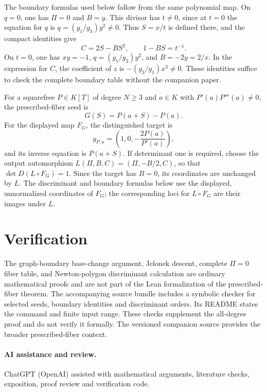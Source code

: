 \documentclass[11pt]{article}
\numberwithin{equation}{section}
\begin{document}
The boundary formulas used below follow from the same polynomial map.
On \(q=0\), one has \(\Pi=0\) and \(B=y\).  This divisor has
\(t\neq0\), since at \(t=0\) the equation for \(q\) is
\(q=(g_1/g_3)y^2\neq0\).  Thus \(S=x/t\) is defined there, and the compact
identities give
\[
 C=2S-BS^2,\qquad 1-BS=t^{-1}.
\]
On \(t=0\), one has \(xy=-1\),
\(q=(g_1/g_3)y^2\), and \(B=-2y=2/x\).  In the expression for \(C\),
the coefficient of \(z\) is \(-(g_3/g_1)x^3\neq0\).  These identities
suffice to check the complete boundary table without the companion paper.

For a squarefree \(P\in K[T]\) of degree \(N\geq3\) and
\(a\in K\) with \(P'(a)P'''(a)\neq0\), the prescribed-fiber seed is
\[
 G(S)=P(a+S)-P(a).
\]
For the displayed map \(F_G\), the distinguished target is
\begin{equation}
 y_{P,a}=\left(1,0,-\frac{2P(a)}{P'(a)}\right),
 \label{eq:prescribed-target}
\end{equation}
and its inverse equation is \(P(a+S)\).  If determinant one is required,
choose the output automorphism \(L(\Pi,B,C)=(\Pi,-B/2,C)\),
so that \(\det D(L\circ F_G)=1\).  Since the target has \(B=0\),
its coordinates are unchanged by \(L\).  The discriminant and boundary
formulas below use the displayed, unnormalized coordinates of \(F_G\);
the corresponding loci for \(L\circ F_G\) are their images under \(L\).



\section*{Verification}

The graph-boundary base-change argument, Jelonek descent, complete
\(\Pi=0\) fiber table, and Newton-polygon discriminant calculation are
ordinary mathematical proofs and are not part of the Lean formalization of
the prescribed-fiber theorem.  The accompanying source bundle includes a symbolic checker for selected
seeds, boundary identities and discriminant orders.  Its README states the
command and finite input range.  These checks supplement the all-degree
proof and do not verify it formally.  The versioned companion source
\cite{Companion} provides the broader prescribed-fiber context.

\paragraph{AI assistance and review.}
ChatGPT (OpenAI) assisted with mathematical arguments, literature checks,
exposition, proof review and verification code.
\end{document}
